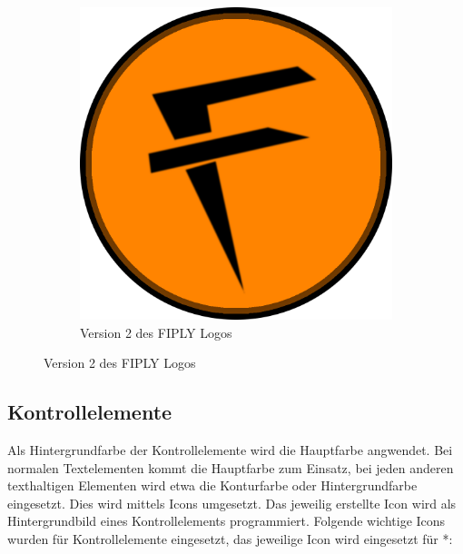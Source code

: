 \documentclass[FIPLY_base.tex]{subfiles}
\begin{document}
	\begin{figure}[H]
		\begin{subfigure}[b]{1\textwidth}
			\centering
			\includegraphics[scale=0.75]{img/icons/Version2}
			\centering
			\caption{Version 2 des FIPLY Logos}
		\end{subfigure}
	\end{figure}
	\subsection{Kontrollelemente}
	Als Hintergrundfarbe der Kontrollelemente wird die Hauptfarbe angwendet. Bei normalen Textelementen kommt die Hauptfarbe zum Einsatz, bei jeden anderen texthaltigen Elementen wird etwa die Konturfarbe oder Hintergrundfarbe eingesetzt. Dies wird mittels Icons umgesetzt. Das jeweilig erstellte Icon wird als Hintergrundbild eines Kontrollelements programmiert. Folgende wichtige Icons wurden für Kontrollelemente eingesetzt, das jeweilige Icon wird eingesetzt für *:
	
\end{document}
